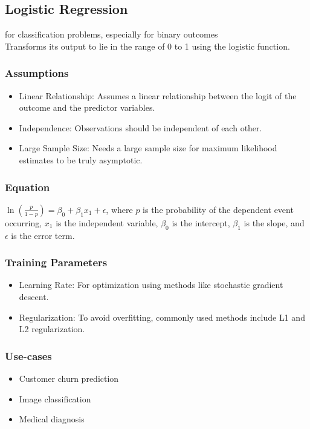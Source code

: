 \documentclass[english, threecolumn]{latex4ei/latex4ei_sheet}
\begin{document}
\begin{sectionbox}
\subsection{Logistic Regression}
for classification problems, especially for binary outcomes\\
Transforms its output to lie in the range of 0 to 1 using the logistic function.

\subsubsection{Assumptions}
\begin{itemize}
    \item Linear Relationship: Assumes a linear relationship between the logit of the outcome and the predictor variables.
    \item Independence: Observations should be independent of each other.
    \item Large Sample Size: Needs a large sample size for maximum likelihood estimates to be truly asymptotic.
\end{itemize}

\subsubsection{Equation}
\( \ln\left(\frac{p}{1-p}\right) = \beta_0 + \beta_1 x_1 + \epsilon \), where \( p \) is the probability of the dependent event occurring, \( x_1 \) is the independent variable, \( \beta_0 \) is the intercept, \( \beta_1 \) is the slope, and \( \epsilon \) is the error term.

\subsubsection{Training Parameters}
\begin{itemize}
    \item Learning Rate: For optimization using methods like stochastic gradient descent.
    \item Regularization: To avoid overfitting, commonly used methods include L1 and L2 regularization.
\end{itemize}

\subsubsection{Use-cases}
\begin{itemize}
    \item Customer churn prediction
    \item Image classification
    \item Medical diagnosis
\end{itemize}


\end{sectionbox}
\end{document}
